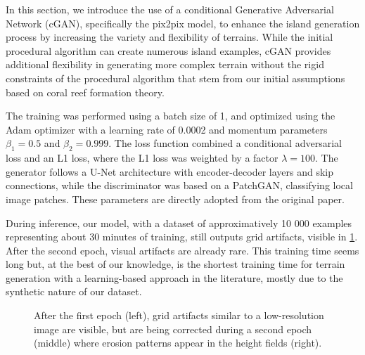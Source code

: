 In this section, we introduce the use of a conditional Generative Adversarial Network (cGAN), specifically the pix2pix model, to enhance the island generation process by increasing the variety and flexibility of terrains. While the initial procedural algorithm can create numerous island examples, cGAN provides additional flexibility in generating more complex terrain without the rigid constraints of the procedural algorithm that stem from our initial assumptions based on coral reef formation theory.


% 

The training was performed using a batch size of 1, and optimized using the Adam optimizer with a learning rate of 0.0002 and momentum parameters $\beta_1 = 0.5$ and $\beta_2 = 0.999$. The loss function combined a conditional adversarial loss and an L1 loss, where the L1 loss was weighted by a factor $\lambda = 100$. The generator follows a U-Net architecture with encoder-decoder layers and skip connections, while the discriminator was based on a PatchGAN, classifying local image patches. These parameters are directly adopted from the original paper.

During inference, our model, with a dataset of approximatively 10 000 examples representing about 30 minutes of training, still outputs grid artifacts, visible in \cref{fig:coral-island-first-epoch}. After the second epoch, visual artifacts are already rare. This training time seems long but, at the best of our knowledge, is the shortest training time for terrain generation with a learning-based approach in the literature, mostly due to the synthetic nature of our dataset.

\begin{figure}[t]
    \caption{After the first epoch (left), grid artifacts similar to a low-resolution image are visible, but are being corrected during a second epoch (middle) where erosion patterns appear in the height fields (right).}
    \label{fig:coral-island-first-epoch}
\end{figure}

